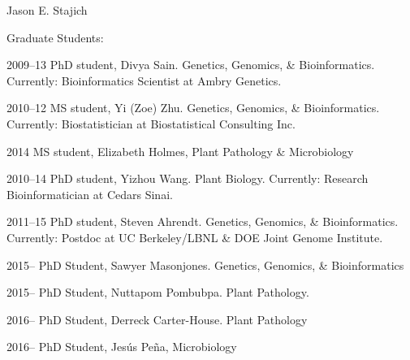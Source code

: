 \documentclass[10pt]{article}
\begin{document}
\begin{cv}{\centerline{Jason E. Stajich}}

\begin{cvlistcompact}{Graduate Students:}
\item [2009--13] PhD student, Divya Sain. Genetics, Genomics, \&
  Bioinformatics. Currently: Bioinformatics Scientist at Ambry Genetics.
\item [2010--12] MS student, Yi (Zoe) Zhu. Genetics, Genomics, \&
  Bioinformatics. Currently: Biostatistician at Biostatistical Consulting Inc.
\item [2014] MS student, Elizabeth Holmes, Plant Pathology \& Microbiology
\item [2010--14] PhD student, Yizhou Wang. Plant Biology. Currently:
  Research Bioinformatician at Cedars Sinai.
\item [2011--15] PhD student, Steven Ahrendt. Genetics, Genomics, \&
  Bioinformatics. Currently: Postdoc at UC Berkeley/LBNL \& DOE Joint
  Genome Institute.
\item [2015--] PhD Student, Sawyer Masonjones. Genetics, Genomics, \&
  Bioinformatics
\item [2015--] PhD Student, Nuttapom Pombubpa. Plant Pathology.
\item [2016--] PhD Student, Derreck Carter-House. Plant Pathology
\item [2016--] PhD Student, Jes\'{u}s Pe\~{n}a, Microbiology
\end{cvlistcompact}


\end{cv}
\end{document}
